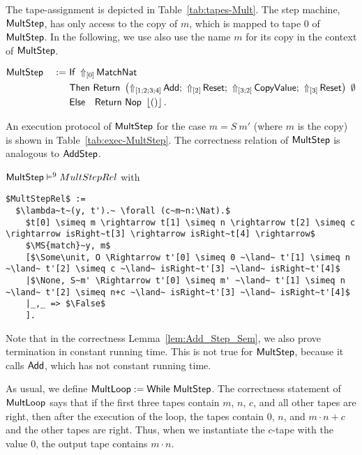 The tape-assignment is depicted in Table~\ref{tab:tapes-Mult}.  The step machine, $\MS{MultStep}$, has only access to the copy of $m$, which is mapped
to tape $0$ of $\MS{MultStep}$.  In the following, we use also use the name $m$ for its copy in the context of $\MS{MultStep}$.
\begin{definition}
  \label{def:Mult_Step}
  \begin{alignat*}{2}
    &\MS{MultStep} &~:=~&
           \MS{If}~\LiftTapes{\MS{MatchNat}}{\Vector{0}} \\
    &&& \MS{Then}  ~\Return{\left( \LiftTapes{\MS{Add}}{\Vector{1;2;3;4}} \Seq
                                \LiftTapes{\MS{Reset}}{\Vector{2}} \Seq
                                \LiftTapes{\MS{CopyValue}}{\Vector{3;2}} \Seq
                                \LiftTapes{\MS{Reset}}{\Vector{3}} \right)}{\None} \\
    &&& \MS{Else}~~~\Return{\MS{Nop}}{\Some\unit}.
  \end{alignat*}
\end{definition}
An execution protocol of $\MS{MultStep}$ for the case $m=S~m'$ (where $m$ is the copy) is shown in Table~\ref{tab:exec-MultStep}.  The correctness
relation of $\MS{MultStep}$ is analogous to $\MS{AddStep}$.
\begin{lemma}
  \label{lem:Mult_Step_Sem}
  $\MS{MultStep} \RealiseIn{9} MultStepRel$ with
  \small
\begin{lstlisting}[style=semicoqstyle]
$MultStepRel$ :=
  $\lambda~t~(y, t').~ \forall (c~m~n:\Nat).$
    $t[0] \simeq m \rightarrow t[1] \simeq n \rightarrow t[2] \simeq c \rightarrow isRight~t[3] \rightarrow isRight~t[4] \rightarrow$
    $\MS{match}~y, m$
    [$\Some\unit, O \Rightarrow t'[0] \simeq 0 ~\land~ t'[1] \simeq n ~\land~ t'[2] \simeq c ~\land~ isRight~t'[3] ~\land~ isRight~t'[4]$
    |$\None, S~m' \Rightarrow t'[0] \simeq m' ~\land~ t'[1] \simeq n ~\land~ t'[2] \simeq n+c ~\land~ isRight~t'[3] ~\land~ isRight~t'[4]$
    |_,_ => $\False$
    ].
\end{lstlisting}
\end{lemma}
Note that in the correctness Lemma~\ref{lem:Add_Step_Sem}, we also prove termination in constant running time.  This is not true for $\MS{MultStep}$,
because it calls $\MS{Add}$, which has not constant running time.

As usual, we define $\MS{MultLoop} := \While~\MS{MultStep}$.  The correctness statement of $\MS{MultLoop}$ says that if the first three tapes contain
$m$, $n$, $c$, and all other tapes are right, then after the execution of the loop, the tapes contain $0$, $n$, and $m \cdot n + c$ and the other
tapes are right.  Thus, when we instantiate the $c$-tape with the value $0$, the output tape contains $m \cdot n$.

